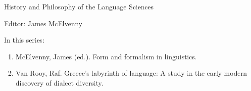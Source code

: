 {\large History and Philosophy of the Language Sciences}

\bigskip

Editor: James McElvenny  

 
\bigskip 
In this series:


\small
\begin{enumerate}
\item McElvenny, James (ed.). Form and formalism in linguistics.
\item Van Rooy, Raf. Greece’s labyrinth of language: A study in the early modern discovery of dialect diversity.
\end{enumerate}
